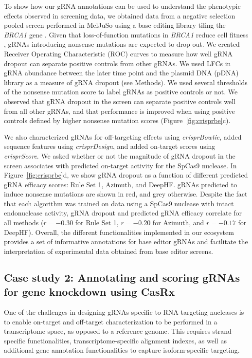 \documentclass[pdftex,english,10pt]{article}
\begin{document}
To show how our gRNA annotations can be used to understand the phenotypic effects observed in screening data, we obtained data from a negative selection pooled screen performed in MelJuSo using a base editing library tiling the \textit{BRCA1} gene \citep{hanna2021massively}. Given that loss-of-function mutations in \textit{BRCA1} reduce cell fitness \citep{findlay2018accurate}, gRNAs introducing nonsense mutations are expected to drop out. We created Receiver Operating Characteristic (ROC) curves to measure how well gRNA dropout can separate positive controls from other gRNAs. We used LFCs in gRNA abundance between the later time point and the plasmid DNA (pDNA) library as a measure of gRNA dropout (see Methods). We used several thresholds of the nonsense mutation score to label gRNAs as positive controls or not. We observed that gRNA dropout in the screen can separate positive controls well from all other gRNAs, and that performance is improved when using positive controls defined by higher nonsense mutation scores (Figure~\ref{fig:crisprbe}c). 


We also characterized gRNAs for off-targeting effects using \textit{crisprBowtie}, added sequence features using \textit{crisprDesign}, and added on-target scores using \textit{crisprScore}. We asked whether or not the magnitude of gRNA dropout in the screen associates with predicted on-target activity for the SpCas9 nuclease. In Figure~\ref{fig:crisprbe}d, we show gRNA dropout as a function of different predicted gRNA efficacy scores: Rule Set 1, Azimuth, and DeepHF.  gRNAs predicted to induce nonsense mutations are shown in red, and grey otherwise. Despite the fact that each algorithm was trained on data using a SpCas9 nuclease with intact endonuclease activity, gRNA dropout and predicted gRNA efficacy correlate for all methods ($r = -0.30$ for Rule Set 1, $r =  -0.20$ for Azimuth, and $r = -0.17$ for DeepHF). Overall, the different functionalities implemented in our ecosystem provides a set of informative annotations for base editor gRNAs and facilitate the interpretation of experimental data obtained from base editor screens.




\subsection*{Case study 2: Annotating and scoring gRNAs for gene knockdown using CasRx}

One of the challenges in designing gRNAs specific to RNA-targeting nucleases is to enable on-target and off-target characterization to be performed in a transcriptome space, as opposed to a reference genome. This requires strand-specific functionalities, transcriptome-specific alignment indexes, as well as additional gene annotation functionalities to capture isoform-specific targeting.  
\end{document}
